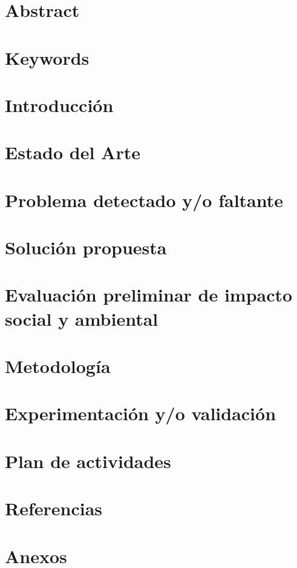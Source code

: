 \documentclass[a4paper,11pt]{article}
\begin{document}
\section{Abstract}

\section{Keywords}

\section{Introducción}

\section{Estado del Arte}

\section{Problema detectado y/o faltante}

\section{Solución propuesta}

\section{Evaluación preliminar de impacto social y ambiental}

\section{Metodología}

\section{Experimentación y/o validación}

\section{Plan de actividades}

\section{Referencias}

\section{Anexos}
\end{document}

